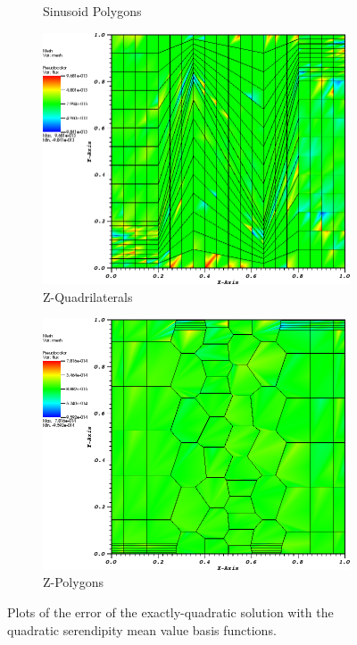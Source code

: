 \begin{figure}
{\begin{subfigure}[b]{0.465\textwidth}
		\caption{Sinusoid Polygons}
	\end{subfigure}
}
{
	\vspace{3mm}
	\begin{subfigure}[b]{0.465\textwidth}
		\centering
		\label{subfig::z_quad_me_k2_lin_sol}
		\includegraphics[width=\textwidth]{figures/sec_BF/quad_err_zquad_MV2.png}
		\caption{Z-Quadrilaterals}
	\end{subfigure}
	\hfill
	\begin{subfigure}[b]{0.465\textwidth}
		\centering
		\label{subfig::z_poly_me_k2_lin_sol}
		\includegraphics[width=\textwidth]{figures/sec_BF/quad_err_zpoly_MV2.png}
		\caption{Z-Polygons}
	\end{subfigure}
}
\caption{Plots of the error of the exactly-quadratic solution with the quadratic serendipity mean value basis functions.}
\label{fig::BF_Results_quad_err_MV2}
\end{figure}

